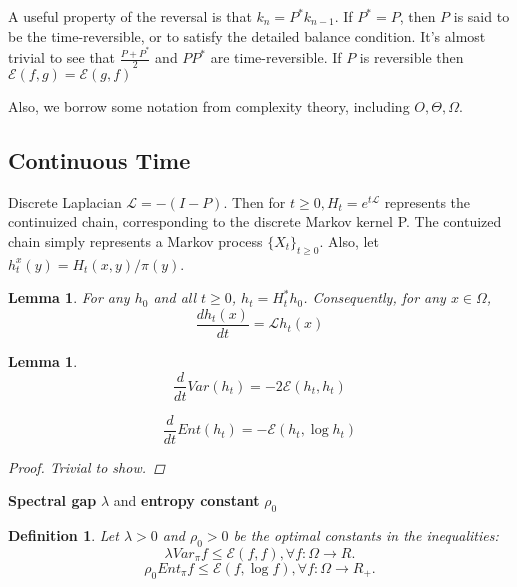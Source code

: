 \documentclass[12pt,reqno]{amsart}
\newtheorem{lem}[thm]{Lemma}
\newtheorem{definition}[thm]{Definition}
{ \theoremstyle{remark}\newtheorem*{remark}{Remark} }
\begin{document}
A useful property of the reversal is that $k_n = P^*k_{n-1}$. If $P^*=P$, then $P$ is said to be the time-reversible, or to satisfy the detailed balance condition. It's almost trivial to see that
$\frac{P+P^*}{2}$  and $PP^*$ are time-reversible.
If $P$ is reversible then $\mathcal{E}(f,g) = \mathcal{E}(g,f)$


Also, we borrow some notation from complexity theory, including $O,\Theta,\Omega$.





\subsection{Continuous Time}
Discrete Laplacian $\mathcal{L} = -(I-P)$. Then for $t\geq 0, H_t = e^{t\mathcal{L}}$ represents the continuized chain, corresponding to the discrete Markov kernel P. The contuized chain simply represents a Markov process $\{X_t\}_{t\geq 0}$. Also, let $h_t^x(y) = H_t(x,y)/\pi(y)$.

\begin{lem}
For any $h_0$ and all $t \geq 0$, $h_t = H^*_th_0$. Consequently, for any $x \in \Omega$,
$$
\frac{dh_t(x)}{dt} = \mathcal{L}h_t(x)
$$
\end{lem}

\begin{lem}
  \begin{equation}
    \frac{d}{dt}Var(h_t) = -2 \mathcal{E}(h_t,h_t)
  \end{equation}

  \begin{equation}
    \frac{d}{dt}Ent(h_t) = - \mathcal{E}(h_t,\log h_t)
  \end{equation}

  \begin{proof}
    Trivial to show.
  \end{proof}
\end{lem}


\textbf{Spectral gap} $\lambda$ and \textbf{entropy constant } $\rho_0$
\begin{definition}
  Let $\lambda > 0$ and $\rho_0 > 0$ be the optimal constants in the inequalities:
  \begin{equation}
    \label{eq:specral_gap}
    \lambda Var_{\pi}f \leq \mathcal{E}(f,f), \forall f:\Omega \rightarrow R.
  \end{equation}
  \begin{equation}
    \label{eq:entropy_constant}
    \rho_0 Ent_{\pi}f \leq \mathcal{E}(f,\log f), \forall f:\Omega \rightarrow R_+.
  \end{equation}
\end{definition}
\end{document}
